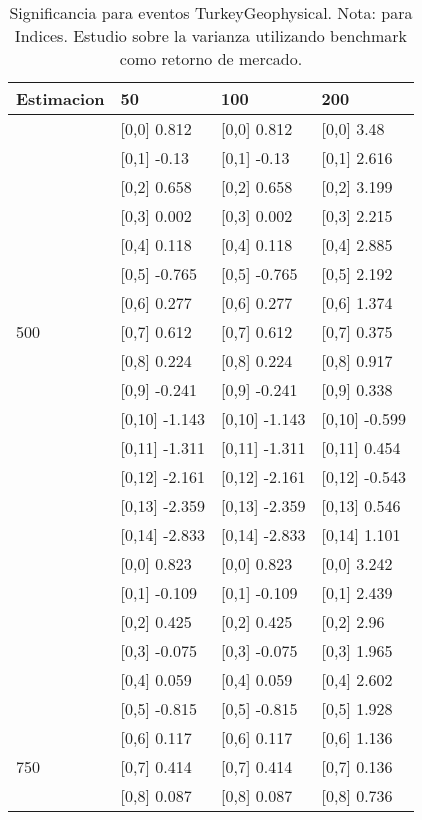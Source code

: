 \begin{table}

\caption{Significancia para eventos TurkeyGeophysical. Nota: para Indices. Estudio sobre la varianza utilizando benchmark como retorno de mercado.}
\centering
\begin{tabular}[t]{llll}
\toprule
Estimacion & 50 & 100 & 200\\
\midrule
 & {}[0,0] 0.812 & {}[0,0] 0.812 & {}[0,0] 3.48\\
 & {}[0,1] -0.13 & {}[0,1] -0.13 & {}[0,1] 2.616\\
 & {}[0,2] 0.658 & {}[0,2] 0.658 & {}[0,2] 3.199\\
 & {}[0,3] 0.002 & {}[0,3] 0.002 & {}[0,3] 2.215\\
 & {}[0,4] 0.118 & {}[0,4] 0.118 & {}[0,4] 2.885\\
\addlinespace
 & {}[0,5] -0.765 & {}[0,5] -0.765 & {}[0,5] 2.192\\
 & {}[0,6] 0.277 & {}[0,6] 0.277 & {}[0,6] 1.374\\
500 & {}[0,7] 0.612 & {}[0,7] 0.612 & {}[0,7] 0.375\\
 & {}[0,8] 0.224 & {}[0,8] 0.224 & {}[0,8] 0.917\\
 & {}[0,9] -0.241 & {}[0,9] -0.241 & {}[0,9] 0.338\\
\addlinespace
 & {}[0,10] -1.143 & {}[0,10] -1.143 & {}[0,10] -0.599\\
 & {}[0,11] -1.311 & {}[0,11] -1.311 & {}[0,11] 0.454\\
 & {}[0,12] -2.161 & {}[0,12] -2.161 & {}[0,12] -0.543\\
 & {}[0,13] -2.359 & {}[0,13] -2.359 & {}[0,13] 0.546\\
 & {}[0,14] -2.833 & {}[0,14] -2.833 & {}[0,14] 1.101\\
\addlinespace
 & {}[0,0] 0.823 & {}[0,0] 0.823 & {}[0,0] 3.242\\
 & {}[0,1] -0.109 & {}[0,1] -0.109 & {}[0,1] 2.439\\
 & {}[0,2] 0.425 & {}[0,2] 0.425 & {}[0,2] 2.96\\
 & {}[0,3] -0.075 & {}[0,3] -0.075 & {}[0,3] 1.965\\
 & {}[0,4] 0.059 & {}[0,4] 0.059 & {}[0,4] 2.602\\
\addlinespace
 & {}[0,5] -0.815 & {}[0,5] -0.815 & {}[0,5] 1.928\\
 & {}[0,6] 0.117 & {}[0,6] 0.117 & {}[0,6] 1.136\\
750 & {}[0,7] 0.414 & {}[0,7] 0.414 & {}[0,7] 0.136\\
 & {}[0,8] 0.087 & {}[0,8] 0.087 & {}[0,8] 0.736\\

\end{tabular}
\end{table}
